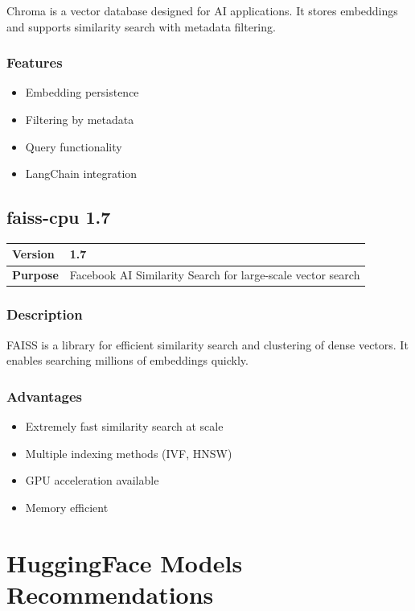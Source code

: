 \documentclass[12pt,a4paper]{report}
\begin{document}
Chroma is a vector database designed for AI applications. It stores embeddings and supports similarity search with metadata filtering.

\subsection{Features}

\begin{itemize}
    \item Embedding persistence
    \item Filtering by metadata
    \item Query functionality
    \item LangChain integration
\end{itemize}

\section{faiss-cpu 1.7}

\begin{tabular}{|p{4cm}|p{10cm}|}
\hline
\textbf{Version} & 1.7 \\
\hline
\textbf{Purpose} & Facebook AI Similarity Search for large-scale vector search \\
\hline
\end{tabular}

\subsection{Description}

FAISS is a library for efficient similarity search and clustering of dense vectors. It enables searching millions of embeddings quickly.

\subsection{Advantages}

\begin{itemize}
    \item Extremely fast similarity search at scale
    \item Multiple indexing methods (IVF, HNSW)
    \item GPU acceleration available
    \item Memory efficient
\end{itemize}

\chapter{HuggingFace Models Recommendations}
\end{document}
